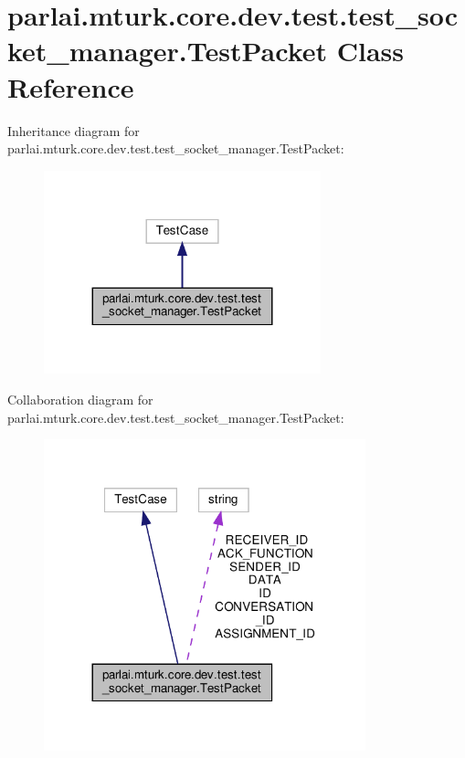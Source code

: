 \hypertarget{classparlai_1_1mturk_1_1core_1_1dev_1_1test_1_1test__socket__manager_1_1TestPacket}{}\section{parlai.\+mturk.\+core.\+dev.\+test.\+test\+\_\+socket\+\_\+manager.\+Test\+Packet Class Reference}
\label{classparlai_1_1mturk_1_1core_1_1dev_1_1test_1_1test__socket__manager_1_1TestPacket}


Inheritance diagram for parlai.\+mturk.\+core.\+dev.\+test.\+test\+\_\+socket\+\_\+manager.\+Test\+Packet\+:
\nopagebreak
\begin{figure}[H]
\begin{center}
\leavevmode
\includegraphics[width=227pt]{classparlai_1_1mturk_1_1core_1_1dev_1_1test_1_1test__socket__manager_1_1TestPacket__inherit__graph}
\end{center}
\end{figure}


Collaboration diagram for parlai.\+mturk.\+core.\+dev.\+test.\+test\+\_\+socket\+\_\+manager.\+Test\+Packet\+:
\nopagebreak
\begin{figure}[H]
\begin{center}
\leavevmode
\includegraphics[width=264pt]{classparlai_1_1mturk_1_1core_1_1dev_1_1test_1_1test__socket__manager_1_1TestPacket__coll__graph}
\end{center}
\end{figure}
